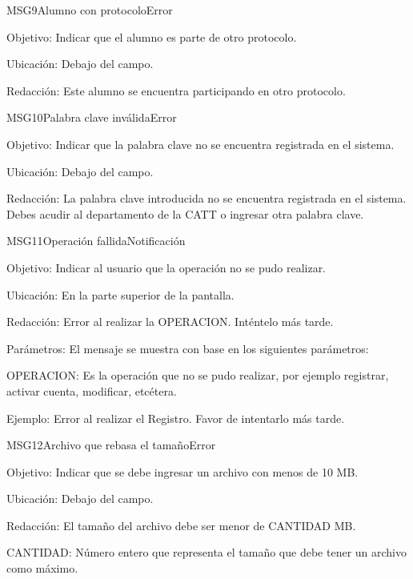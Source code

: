 \begin{mensaje}{MSG9}{Alumno con protocolo}{Error}
	\item[Objetivo:] Indicar que el alumno es parte de otro protocolo.
    \item[Ubicación:] Debajo del campo.
    \item[Redacción:] Este alumno se encuentra participando en otro protocolo.
\end{mensaje}

\begin{mensaje}{MSG10}{Palabra clave inválida}{Error}
	\item[Objetivo:] Indicar que la palabra clave no se encuentra registrada en el sistema.
    \item[Ubicación:] Debajo del campo.
    \item[Redacción:] La palabra clave introducida no se encuentra registrada en el sistema. Debes acudir al departamento de la CATT o ingresar otra palabra clave.
\end{mensaje}

\begin{mensaje}{MSG11}{Operación fallida}{Notificación}
	\item[Objetivo:] Indicar al usuario que la operación no se pudo realizar.
	\item[Ubicación:] En la parte superior de la pantalla.
	\item[Redacción:] Error al realizar la OPERACION. Inténtelo más tarde. 
	\item[Parámetros:] El mensaje se muestra con base en los siguientes parámetros:
	\begin{Citemize}
		\item OPERACION: Es la operación que no se pudo realizar, por ejemplo registrar, activar cuenta, modificar, etcétera.
	\end{Citemize}
	\item[Ejemplo:] Error al realizar el Registro. Favor de intentarlo más tarde.
\end{mensaje}

\begin{mensaje}{MSG12}{Archivo que rebasa el tamaño}{Error}
	\item[Objetivo:] Indicar que se debe ingresar un archivo con menos de 10 MB.
    \item[Ubicación:] Debajo del campo.
	\item[Redacción:] El tamaño del archivo debe ser menor de CANTIDAD MB.
	\begin{Citemize}
	   	\item CANTIDAD: Número entero que representa el tamaño que debe tener un archivo como máximo.
	\end{Citemize}
\end{mensaje}

